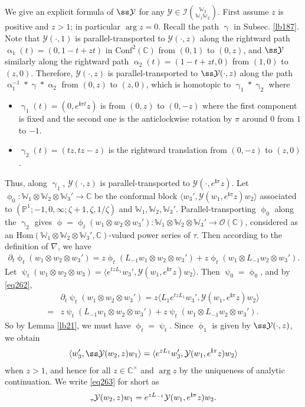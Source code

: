 \documentclass[12pt,a4paper,notitlepage]{article}
\theoremstyle{definition}
\theoremstyle{plain}
\newcommand{\mc}{\mathcal}
\newcommand{\Hom}{\mathrm{Hom}}
\newcommand{\Conf}{\mathrm{Conf}}
\newcommand{\bk}[1]{\langle {#1}\rangle}
\newcommand{\scr}{\mathscr}
\newcommand{\im}{\mathbf{i}}
\newcommand{\Wbb}{\mathbb W}
\newcommand{\Cbb}{\mathbb C}
\newcommand{\Pbb}{\mathbb P}
\numberwithin{equation}{section}
\begin{document}
\subsection{}

We give an explicit formula of $\ss\mc Y$ for any $\mc Y\in\mc I{\Wbb_3\choose\Wbb_1\Wbb_2}$. First assume $z$ is positive and $z>1$; in particular $\arg z=0$. Recall the path $\upgamma$ in Subsec. \ref{lb187}. Note that $\mc Y(\cdot, 1)$ is parallel-transported to $\mc Y(\cdot,z)$ along the rightward path $\upalpha_1(t)=(0,1-t+zt)$ in $\Conf^2(\Cbb)$ from $(0,1)$ to $(0,z)$, and $\ss\mc Y$ similarly along the rightward path $\upalpha_2(t)=(1-t+zt,0)$ from $(1,0)$ to $(z,0)$. Therefore, $\mc Y(\cdot,z)$ is parallel-transported to $\ss\mc Y(\cdot,z)$ along the path $\upalpha^{-1}_1*\upgamma*\upalpha_2$  from  $(0,z)$ to $(z,0)$, which is homotopic to $\upgamma_1*\upgamma_2$ where
\begin{itemize}
\item $\upgamma_1(t)=(0,e^{\im \pi t}z)$ is from $(0,z)$ to $(0,-z)$ where the first component is fixed and the second one is the anticlockwise rotation by $\pi$ around $0$ from $1$ to $-1$.
\item $\upgamma_2(t)=(tz,tz-z)$ is the rightward translation from $(0,-z)$ to $(z,0)$.
\end{itemize}
Thus, along $\upgamma_1$, $\mc Y(\cdot,z)$ is parallel-transported to $\mc Y(\cdot,e^{\im\pi}z)$. Let $\upphi_0:\Wbb_1\otimes\Wbb_2\otimes\Wbb_3'\rightarrow\Cbb$ be the conformal block $\bk{w_3',\mc Y(w_1,e^{\im\pi}z)w_2}$ associated to $(\Pbb^1;-1,0,\infty;\zeta+1,\zeta,1/\zeta)$ and $\Wbb_1,\Wbb_2,\Wbb_3'$. Parallel-transporting $\upphi_0$ along the  $\upgamma_2$  gives $\upphi=\upphi_t(w_1\otimes w_2\otimes w_3'):\Wbb_1\otimes\Wbb_2\otimes\Wbb_3'\rightarrow\scr O(\Cbb)$, considered as an $\Hom(\Wbb_1\otimes\Wbb_2\otimes\Wbb_3',\Cbb)$-valued power series of $\tau$. Then according to the definition of $\nabla$, we have
\begin{align*}
\partial_t\upphi_t(w_1\otimes w_2\otimes w_3')=z\upphi_t(L_{-1}w_1\otimes w_2\otimes w_3')+z\upphi_t(w_1\otimes L_{-1}w_2\otimes w_3').
\end{align*}
Let $\uppsi_t(w_1\otimes w_2\otimes w_3)=\bk{e^{tz L_1}w_3',\mc Y(w_1,e^{\im\pi}z)w_2}$. Then $\uppsi_0=\upphi_0$, and by \eqref{eq262},
\begin{align*}
&\partial_t\uppsi_t(w_1\otimes w_2\otimes w_3')=z\bk{L_1e^{tz L_1}w_3',\mc Y(w_1,e^{\im\pi}z)w_2}\\
=&z\uppsi_t(L_{-1}w_1\otimes w_2\otimes w_3')+z\uppsi_t(w_1\otimes L_{-1}w_2\otimes w_3').
\end{align*}
So by Lemma \ref{lb21}, we must have $\upphi_t=\uppsi_t$. Since $\upphi_1$ is given by $\ss\mc Y(\cdot,z)$, we obtain
\begin{align}
\bk{w_3',\ss\mc Y(w_2,z)w_1}=\bk{e^{zL_1}w_3',\mc Y(w_1,e^{\im\pi}z)w_2}\label{eq263}
\end{align}
when $z>1$, and hence for all $z\in\Cbb^\times$ and $\arg z$ by the uniqueness of analytic continuation. We write \eqref{eq263} for short as
\begin{align}
\ss\mc Y(w_2,z)w_1=e^{zL_{-1}}\mc Y(w_1,e^{\im\pi}z)w_2.\label{eq265}
\end{align} 
\end{document}
